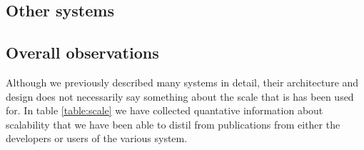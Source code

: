 \documentclass{sig-alternate}
\begin{document}



%
\subsection{Other systems}

\subsection{Overall observations}

Although we previously described many \pilot systems in detail, their
architecture and design does not necessarily say something about the scale that
is has been used for. In table \ref{table:scale} we have collected quantative
information about scalability that we have been able to distil from
publications from either the developers or users of the various system.
\end{document}
